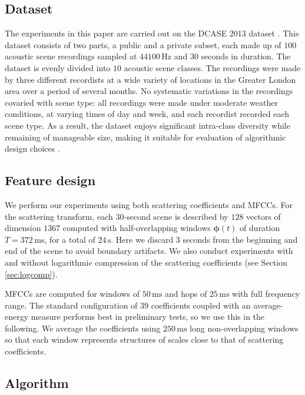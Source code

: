 \documentclass[smallextended]{svjour3}
\begin{document}
\subsection{Dataset}

The experiments in this paper are carried out on the DCASE 2013 dataset \cite{7100934}.
This dataset consists of two parts, a public and a private subset, each made up of $100$ acoustic scene recordings sampled at $44100\,\mathrm{Hz}$ and $30$ seconds in duration. The dataset is evenly divided into $10$ acoustic scene classes. The recordings were made by three different recordists at a wide variety of locations in the Greater London area over a period of several months. No
systematic variations in the recordings covaried with scene
type: all recordings were made under moderate weather conditions, at varying times of day and week, and each recordist recorded each scene type. As a result, the dataset enjoys significant intra-class diversity while remaining of manageable size, making it suitable for evaluation of algorithmic design choices \cite{lagrange:hal-01082501}.

\subsection{Feature design}

We perform our experiments using both scattering coefficients and MFCCs. For the scattering transform, each $30$-second scene is described by $128$ vectors of dimension $1367$ computed with half-overlapping windows $\boldsymbol{\phi}(t)$ of duration $T=372\,\mathrm{ms}$, for a total of $24\,\mathrm{s}$. Here we discard $3$ seconds from the beginning and end of the scene to avoid boundary artifacts. We also conduct experiments with and without logarithmic compression of the scattering coefficients (see Section \ref{sec:logcomp}).

MFCCs are computed for windows of $50\,\mathrm{ms}$ and hops of $25\,\mathrm{ms}$ with full frequency range. The standard configuration of $39$ coefficients coupled with an average-energy measure performs best in preliminary tests, so we use this in the following. We average the coefficients using $250\,\mathrm{ms}$ long non-overlapping windows so that each window represents structures of scales close to that of scattering coefficients.

\subsection{Algorithm}
\end{document}
